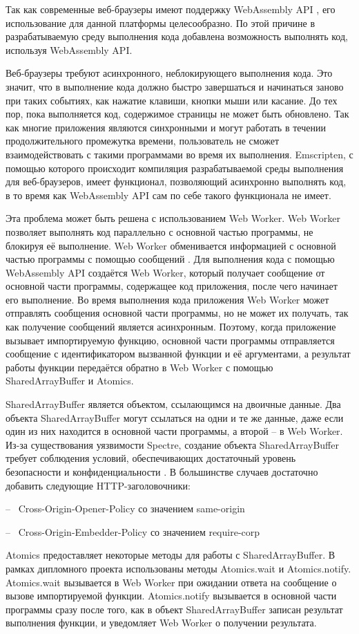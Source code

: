 Так как современные веб-браузеры имеют поддержку WebAssembly API \cite{WasmBrowserSupport}, его использование для данной платформы целесообразно.
По этой причине в разрабатываемую среду выполнения кода добавлена возможность выполнять код, используя WebAssembly API.

Веб-браузеры требуют асинхронного, неблокирующего выполнения кода. 
Это значит, что в выполнение кода должно быстро завершаться и начинаться заново при таких событиях, как нажатие клавиши, кнопки мыши или касание.
До тех пор, пока выполняется код, содержимое страницы не может быть обновлено.
Так как многие приложения являются синхронными и могут работать в течении продолжительного промежутка времени, пользователь не сможет взаимодействовать с такими программами во время их выполнения.
Emscripten, с помощью которого происходит компиляция разрабатываемой среды выполнения для веб-браузеров, имеет функционал, позволяющий асинхронно выполнять код, в то время как WebAssembly API сам по себе такого функционала не имеет.

Эта проблема может быть решена с использованием Web Worker.
Web Worker позволяет выполнять код параллельно с основной частью программы, не блокируя её выполнение.
Web Worker обменивается информацией с основной частью программы с помощью сообщений \cite{WebWorkerMessages}.
Для выполнения кода с помощью WebAssembly API создаётся Web Worker, который получает сообщение от основной части программы, содержащее код приложения, после чего начинает его выполнение.
Во время выполнения кода приложения Web Worker может отправлять сообщения основной части программы, но не может их получать, так как получение сообщений является асинхронным.
Поэтому, когда приложение вызывает импортируемую функцию, основной части программы отправляется сообщение с идентификатором вызванной функции и её аргументами, а результат работы функции передаётся обратно в Web Worker с помощью SharedArrayBuffer и Atomics.

SharedArrayBuffer является объектом, ссылающимся на двоичные данные.
Два объекта SharedArrayBuffer могут ссылаться на одни и те же данные, даже если один из них находится в основной части программы, а второй -- в Web Worker.
Из-за существования уязвимости Spectre, создание объекта SharedArrayBuffer требует соблюдения условий, обеспечивающих достаточный уровень безопасности и конфиденциальности \cite{SharedArrayBuffer}. В большинстве случаев достаточно добавить следующие HTTP-заголовочники:

-- ~Cross-Origin-Opener-Policy со значением same-origin 

-- ~Cross-Origin-Embedder-Policy со значением require-corp

Atomics предоставляет некоторые методы для работы с SharedArrayBuffer.
В рамках дипломного проекта использованы методы Atomics.wait и Atomics.notify.
Atomics.wait вызывается в Web Worker при ожидании ответа на сообщение о вызове импортируемой функции.
Atomics.notify вызывается в основной части программы сразу после того, как в объект SharedArrayBuffer записан результат выполнения функции, и уведомляет Web Worker о получении результата.

